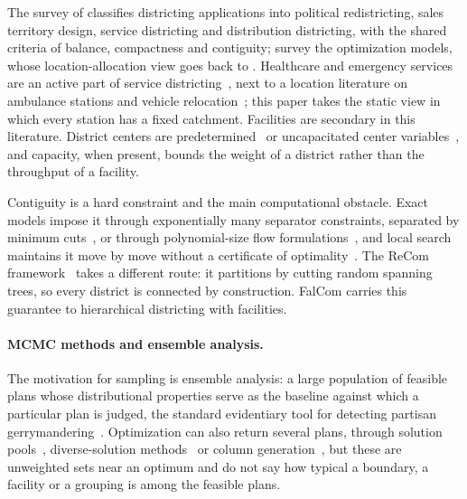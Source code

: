\documentclass[11pt]{article}
\theoremstyle{definition}
\begin{document}
The survey of \citet{kalcsics2020districting} classifies districting applications into political redistricting, sales territory design, service districting and distribution districting, with the shared criteria of balance, compactness and contiguity; \citet{rios2020optimal} survey the optimization models, whose location-allocation view goes back to \citet{hess1965nonpartisan}. Healthcare and emergency services are an active part of service districting~\citep{blais2003solving,darmian2021optimization,wang2025cluster}, next to a location literature on ambulance stations and vehicle relocation~\citep{brotcorne2003ambulance,aringhieri2017emergency}; this paper takes the static view in which every station has a fixed catchment. Facilities are secondary in this literature. District centers are predetermined~\citep{blais2003solving} or uncapacitated center variables~\citep{RIOSMERCADO2009755, rios2013commercial}, and capacity, when present, bounds the weight of a district rather than the throughput of a facility.

Contiguity is a hard constraint and the main computational obstacle. Exact models impose it through exponentially many separator constraints, separated by minimum cuts~\citep{validi2022imposing, validi2022cutedges}, or through polynomial-size flow formulations~\citep{shirabe2005model}, and local search maintains it move by move without a certificate of optimality~\citep{ricca2013political}. The ReCom framework~\citep{deford2021recombination} takes a different route: it partitions by cutting random spanning trees, so every district is connected by construction. FalCom carries this guarantee to hierarchical districting with facilities.

\paragraph{MCMC methods and ensemble analysis.}
The motivation for sampling is ensemble analysis: a large population of feasible plans whose distributional properties serve as the baseline against which a particular plan is judged, the standard evidentiary tool for detecting partisan gerrymandering~\citep{chikina2017assessing, deford2021recombination}. Optimization can also return several plans, through solution pools~\citep{danna2007generating}, diverse-solution methods~\citep{trapp2015finding} or column generation~\citep{gurnee2021fairmandering}, but these are unweighted sets near an optimum and do not say how typical a boundary, a facility or a grouping is among the feasible plans.
\end{document}
